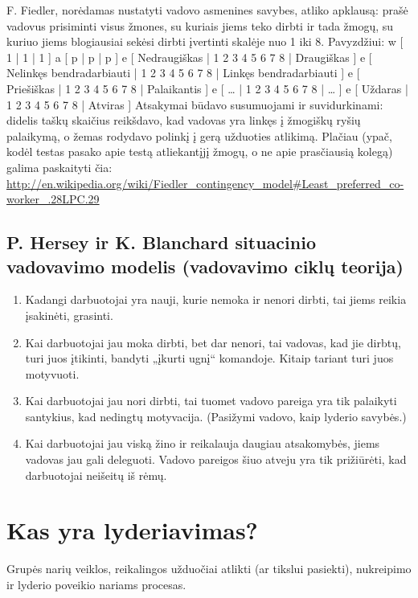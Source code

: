 F. Fiedler, norėdamas nustatyti vadovo asmenines savybes, atliko
apklausą: prašė vadovus prisiminti visus žmones, su kuriais jiems
teko dirbti ir tada žmogų, su kuriuo jiems blogiausiai sekėsi
dirbti įvertinti skalėje nuo 1 iki 8. Pavyzdžiui:
\xtable
{
  w [ 1 | 1 | 1 ]
  a [ p | p | p ]
  e [ Nedraugiškas | 1 2 3 4 5 6 7 8 | Draugiškas ]
  e [ Nelinkęs bendradarbiauti | 1 2 3 4 5 6 7 8 | Linkęs bendradarbiauti ]
  e [ Priešiškas | 1 2 3 4 5 6 7 8 | Palaikantis ]
  e [ … | 1 2 3 4 5 6 7 8 | … ]
  e [ Uždaras | 1 2 3 4 5 6 7 8 | Atviras ]
}
Atsakymai būdavo susumuojami ir suvidurkinami: didelis taškų skaičius
reikšdavo, kad vadovas yra linkęs į žmogiškų ryšių palaikymą, o
žemas rodydavo polinkį į gerą užduoties atlikimą. Plačiau (ypač, kodėl
testas pasako apie testą atliekantįjį žmogų, o ne apie prasčiausią
kolegą) galima paskaityti čia:
\url{http://en.wikipedia.org/wiki/Fiedler_contingency_model#Least_preferred_co-worker_.28LPC.29}

\subsection{P. Hersey ir K. Blanchard situacinio vadovavimo modelis
(vadovavimo ciklų teorija)}

\begin{enumerate}
  \item Kadangi darbuotojai yra nauji, kurie nemoka ir nenori dirbti,
    tai jiems reikia įsakinėti, grasinti.
  \item Kai darbuotojai jau moka dirbti, bet dar nenori, tai vadovas,
    kad jie dirbtų, turi juos įtikinti, bandyti „įkurti ugnį“ komandoje.
    Kitaip tariant turi juos motyvuoti.
  \item Kai darbuotojai jau nori dirbti, tai tuomet vadovo pareiga yra tik
    palaikyti santykius, kad nedingtų motyvacija. (Pasižymi vadovo, kaip
    lyderio savybės.)
  \item Kai darbuotojai jau viską žino ir reikalauja daugiau atsakomybės,
    jiems vadovas jau gali deleguoti. Vadovo pareigos šiuo atveju yra tik
    prižiūrėti, kad darbuotojai neišeitų iš rėmų.
\end{enumerate}

\section{Kas yra lyderiavimas?}

\begin{defn}[Lyderiavimas]
  Grupės narių veiklos, reikalingos užduočiai atlikti (ar tikslui pasiekti),
  nukreipimo ir lyderio poveikio nariams procesas.
\end{defn}

